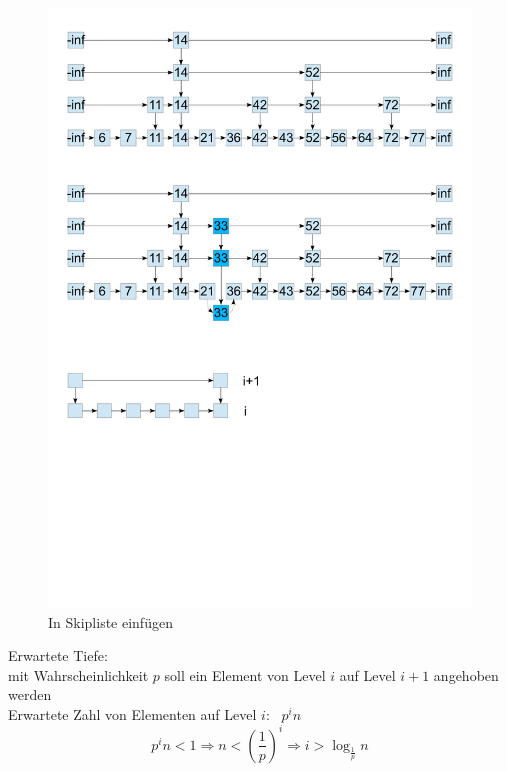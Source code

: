 \documentclass[a4paper,twoside,10pt]{report}
\begin{document}
\begin{figure}[H]\center
\includegraphics[trim= .9cm 14cm .9cm 8cm,clip,width=\columnwidth]{figures/skiplist.pdf}
\caption{In Skipliste einfügen}
\end{figure}

Erwartete Tiefe:\\
mit Wahrscheinlichkeit $p$ soll ein Element von Level $i$ auf Level $i+1$ angehoben werden\\
Erwartete Zahl von Elementen auf Level $i$: \, $p^in$
\[p^in<1 \Rightarrow n < \left(\frac{1}{p}\right)^i \Rightarrow i>\log_\frac{1}{p}n\]
\end{document}
